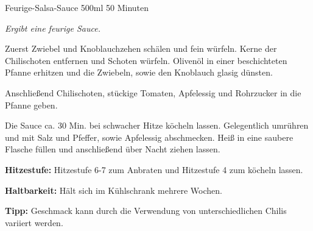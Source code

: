 \begin{recipe}{Feurige-Salsa-Sauce} {500ml} {50 Minuten}

\freeform
\textit{Ergibt eine feurige Sauce.}


Zuerst Zwiebel und Knoblauchzehen schälen und fein würfeln.
Kerne der Chilischoten entfernen und Schoten würfeln.
Olivenöl in einer beschichteten Pfanne erhitzen und die Zwiebeln, sowie den Knoblauch glasig dünsten.


Anschließend Chilischoten, stückige Tomaten, Apfelessig und Rohrzucker in die Pfanne geben.


Die Sauce ca. 30 Min. bei schwacher Hitze köcheln lassen.
Gelegentlich umrühren und mit Salz und Pfeffer, sowie Apfelessig abschmecken.
Heiß in eine saubere Flasche füllen und anschließend über Nacht ziehen lassen.

\freeform
\hrulefill

\freeform
\textbf{Hitzestufe:}
Hitzestufe 6-7 zum Anbraten und Hitzestufe 4 zum köcheln lassen.

\freeform 
\textbf{Haltbarkeit:}
Hält sich im Kühlschrank mehrere Wochen.

\freeform 
\textbf{Tipp:}
Geschmack kann durch die Verwendung von unterschiedlichen Chilis variiert werden.

\end{recipe}

